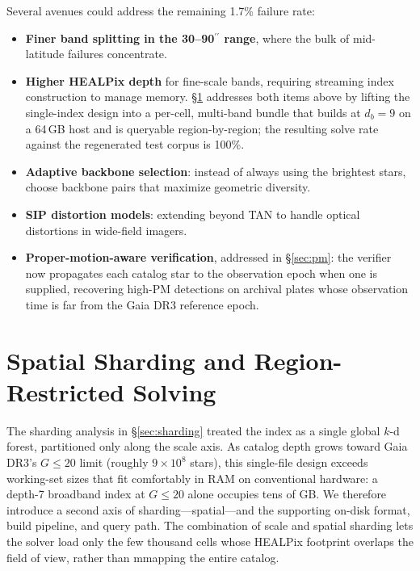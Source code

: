 \documentclass[twocolumn, 10pt]{article}
\newcommand{\arcsec}{\ensuremath{^{\prime\prime}}}
\begin{document}
Several avenues could address the remaining 1.7\% failure rate:
\begin{itemize}
    \item \textbf{Finer band splitting in the 30--90\arcsec{} range},
          where the bulk of mid-latitude failures concentrate.
    \item \textbf{Higher HEALPix depth} for fine-scale bands, requiring
          streaming index construction to manage memory.
          §\ref{sec:bundle} addresses both items above by lifting the
          single-index design into a per-cell, multi-band bundle that
          builds at $d_b{=}9$ on a 64\,GB host and is queryable
          region-by-region; the resulting solve rate against the
          regenerated test corpus is 100\%.
    \item \textbf{Adaptive backbone selection}: instead of always using
          the brightest stars, choose backbone pairs that maximize
          geometric diversity.
    \item \textbf{SIP distortion models}: extending beyond TAN to handle
          optical distortions in wide-field imagers.
    \item \textbf{Proper-motion-aware verification}, addressed in
          \S\ref{sec:pm}: the verifier now propagates each catalog
          star to the observation epoch when one is supplied,
          recovering high-PM detections on archival plates whose
          observation time is far from the Gaia DR3 reference epoch.
\end{itemize}

\section{Spatial Sharding and Region-Restricted Solving} \label{sec:bundle}

The sharding analysis in §\ref{sec:sharding} treated the index as a
single global $k$-d forest, partitioned only along the scale axis. As
catalog depth grows toward Gaia DR3's $G \le 20$ limit (roughly $9 \times
10^{8}$ stars), this single-file design exceeds working-set sizes that
fit comfortably in RAM on conventional hardware: a depth-7 broadband
index at $G \le 20$ alone occupies tens of GB. We therefore introduce a
second axis of sharding---spatial---and the supporting on-disk format,
build pipeline, and query path. The combination of scale and spatial
sharding lets the solver load only the few thousand cells whose
HEALPix footprint overlaps the field of view, rather than mmapping
the entire catalog.
\end{document}
